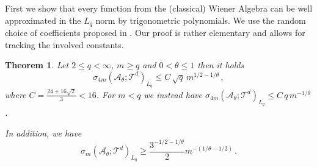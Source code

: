 \documentclass[11pt,reqno]{article}
\numberwithin{equation}{section}
\theoremstyle{definition}
\theoremstyle{plain}
\newtheorem{theorem}[satz]{Theorem}
\newcommand{\ca}{\ensuremath{\mathcal A}}
\newcommand{\be}{\begin{equation}}
\newcommand{\ee}{\end{equation}}
\begin{document}

First we show that every function from the (classical) Wiener Algebra can be well approximated in the $L_q$ norm by trigonometric polynomials. We use the random choice of coefficients proposed in \cite[Lem.\ 2]{Mak84}. Our proof is rather elementary and allows for tracking the involved constants. 

\begin{theorem} \label{tracAq}
Let \(2 \leq q < \infty\), \(m \geq q\) and \(0 <\theta \leq 1\) then it holds
\be\label{thm:4.4}
\sigma_{4m}(\ca_\theta;\mathcal{T}^d)_{L_q} \leq C\, \sqrt{q}\, m^{1/2-1/\theta}\,,
\ee
where $C =\frac{24 + 16 \sqrt{2}}{3} <  16$. For \(m < q\) we instead have
\(\sigma_{4m}(\ca_\theta;\mathcal{T}^d)_{L_q} \leq C\, q\, m^{-1/\theta}\).

In addition, we have
\be\label{thm:4.4_1}
\sigma_{m}(\ca_\theta;\mathcal{T}^d)_{L_q} \geq  \frac{3^{-1/2-1/\theta}}{2} m^{-(1/\theta-1/2)}\,.
\ee
\end{theorem}


\end{document}
